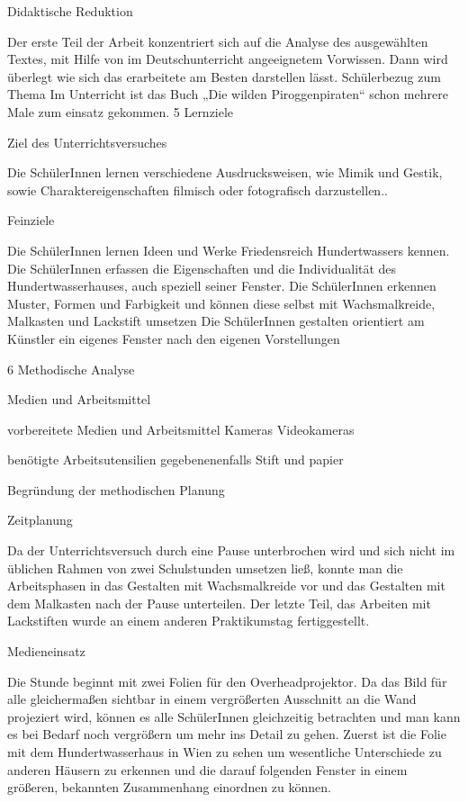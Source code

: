  Didaktische Reduktion

Der erste Teil der Arbeit konzentriert sich auf die Analyse des ausgewählten Textes, mit Hilfe von im Deutschunterricht angeeignetem Vorwissen. Dann wird überlegt wie sich das erarbeitete am Besten darstellen lässt.
 Schülerbezug zum Thema
Im Unterricht ist das Buch „Die wilden Piroggenpiraten“  schon mehrere Male zum einsatz gekommen. 
5 Lernziele

Ziel des Unterrichtsversuches

Die SchülerInnen lernen verschiedene Ausdrucksweisen, wie Mimik und Gestik, sowie Charaktereigenschaften filmisch oder fotografisch darzustellen..


Feinziele

Die SchülerInnen lernen Ideen und Werke Friedensreich Hundertwassers kennen.
Die SchülerInnen erfassen die Eigenschaften und die Individualität des Hundertwasserhauses, auch speziell seiner Fenster.
Die SchülerInnen erkennen Muster, Formen und Farbigkeit und können diese selbst mit Wachsmalkreide, Malkasten und Lackstift umsetzen
Die SchülerInnen gestalten orientiert am Künstler ein eigenes Fenster nach den eigenen Vorstellungen

6 Methodische Analyse

 Medien und Arbeitsmittel

vorbereitete Medien und Arbeitsmittel
Kameras 
Videokameras

benötigte Arbeitsutensilien
gegebenenenfalls Stift und papier


 Begründung der methodischen Planung

Zeitplanung

Da der Unterrichtsversuch durch eine Pause unterbrochen wird und sich nicht im üblichen Rahmen von zwei Schulstunden umsetzen ließ, konnte man die Arbeitsphasen in das Gestalten mit Wachsmalkreide vor und das Gestalten mit dem Malkasten nach der Pause unterteilen. Der letzte Teil, das Arbeiten mit Lackstiften wurde an einem anderen Praktikumstag fertiggestellt.

Medieneinsatz

Die Stunde beginnt mit zwei Folien für den Overheadprojektor. Da das Bild für alle gleichermaßen sichtbar in einem vergrößerten Ausschnitt an die Wand projeziert wird, können es alle SchülerInnen gleichzeitig betrachten und man kann es bei Bedarf noch vergrößern um mehr ins Detail zu gehen. Zuerst ist die Folie mit dem Hundertwasserhaus in Wien zu sehen um wesentliche Unterschiede zu anderen Häusern zu erkennen und die darauf folgenden Fenster in einem größeren, bekannten Zusammenhang einordnen zu können.

